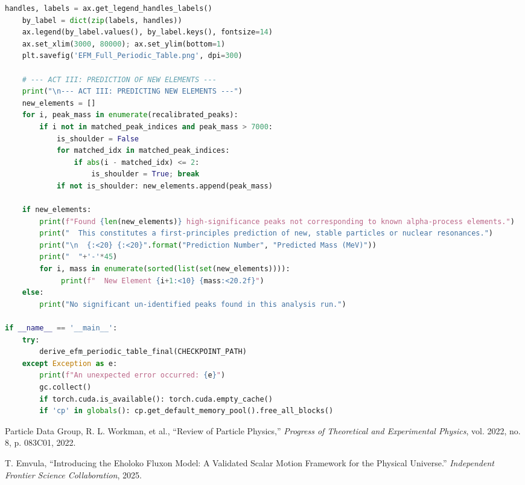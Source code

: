 \documentclass[11pt, twoside]{article}
\begin{document}
\begin{lstlisting}[language=Python, caption=EFM Definitive Periodic Table Derivation Engine (V30 FINAL - Corrected)]
    handles, labels = ax.get_legend_handles_labels()
    by_label = dict(zip(labels, handles))
    ax.legend(by_label.values(), by_label.keys(), fontsize=14)
    ax.set_xlim(3000, 80000); ax.set_ylim(bottom=1)
    plt.savefig('EFM_Full_Periodic_Table.png', dpi=300)

    # --- ACT III: PREDICTION OF NEW ELEMENTS ---
    print("\n--- ACT III: PREDICTING NEW ELEMENTS ---")
    new_elements = []
    for i, peak_mass in enumerate(recalibrated_peaks):
        if i not in matched_peak_indices and peak_mass > 7000:
            is_shoulder = False
            for matched_idx in matched_peak_indices:
                if abs(i - matched_idx) <= 2: 
                    is_shoulder = True; break
            if not is_shoulder: new_elements.append(peak_mass)

    if new_elements:
        print(f"Found {len(new_elements)} high-significance peaks not corresponding to known alpha-process elements.")
        print("  This constitutes a first-principles prediction of new, stable particles or nuclear resonances.")
        print("\n  {:<20} {:<20}".format("Prediction Number", "Predicted Mass (MeV)"))
        print("  "+'-'*45)
        for i, mass in enumerate(sorted(list(set(new_elements)))):
             print(f"  New Element {i+1:<10} {mass:<20.2f}")
    else:
        print("No significant un-identified peaks found in this analysis run.")

if __name__ == '__main__':
    try:
        derive_efm_periodic_table_final(CHECKPOINT_PATH)
    except Exception as e:
        print(f"An unexpected error occurred: {e}")
        gc.collect()
        if torch.cuda.is_available(): torch.cuda.empty_cache()
        if 'cp' in globals(): cp.get_default_memory_pool().free_all_blocks()
\end{lstlisting}


\begin{thebibliography}{2}
\raggedright
{}
Particle Data Group, R. L. Workman, et al., ``Review of Particle Physics,'' \textit{Progress of Theoretical and Experimental Physics}, vol. 2022, no. 8, p. 083C01, 2022.

T. Emvula, ``Introducing the Eholoko Fluxon Model: A Validated Scalar Motion Framework for the Physical Universe.'' \textit{Independent Frontier Science Collaboration}, 2025.
\end{thebibliography}
\end{document}
